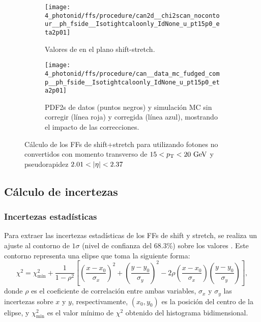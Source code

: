 \begin{figure}[ht!]
    \centering
    \begin{subfigure}[t]{0.49\linewidth}
        \centering
        \texttt{[image: 4\_photonid/ffs/procedure/can2d\_\_chi2scan\_nocontour\_\_ph\_fside\_\_Isotightcaloonly\_IdNone\_u\_pt15p0\_eta2p01]}
        \caption{Valores de \chisq en el plano shift-stretch.}
        \label{fig:ss_corrections:ffs:calculation:fside_calculation:chi2}
    \end{subfigure}
    \hfill
    \begin{subfigure}[t]{0.49\linewidth}
        \centering
        \texttt{[image: 4\_photonid/ffs/procedure/can\_\_data\_mc\_fudged\_comp\_\_ph\_fside\_\_Isotightcaloonly\_IdNone\_u\_pt15p0\_eta2p01]}
        \caption{\acp{PDF2} de datos (puntos negros) y simulaci\'on \ac{MC} sin corregir (l\'inea roja) y corregida (l\'inea azul), mostrando el impacto de las correcciones.}
        \label{fig:ss_corrections:ffs:calculation:fside_calculation:pdfs}
    \end{subfigure}
    \caption{C\'alculo de los \acp{FF} de shift+stretch para \fside utilizando fotones no convertidos con momento transverso de \(15<p_{\text{T}}<20~\text{GeV}\) y pseudorapidez \(2.01<\abseta<2.37\) }
    \label{fig:ss_corrections:ffs:calculation:fside_calculation}
\end{figure}







\subsection{C\'alculo de incertezas}
\label{subsec:ss_corrections:ffs:uncs}

\subsubsection{Incertezas estad\'isticas}

Para extraer las incertezas estadísticas de los \acp{FF} de shift y stretch, se realiza un ajuste al contorno de \(1\sigma\) (nivel de confianza del \(68.3\%\)) sobre los valores \chisq. Este contorno representa una elipse que toma la siguiente forma:
\begin{equation}
    \chi^2 = \chi^2_{\text{min}} + \frac{1}{1-\rho^2} \left[ \left( \frac{x-x_0}{\sigma_x} \right)^2 + \left( \frac{y-y_0}{\sigma_y} \right)^2 - 2\rho \left( \frac{x-x_0}{\sigma_x} \right) \left( \frac{y-y_0}{\sigma_y} \right) \right],
\end{equation}
donde \(\rho\) es el coeficiente de correlación entre ambas variables, \(\sigma_x\) y \(\sigma_y\) las incertezas sobre \(x\) y \(y\), respectivamente, \((x_0, y_0)\) es la posici\'on del centro de la elipse, y \(\chi^2_{\text{min}}\) es el valor mínimo de \(\chi^2\) obtenido del histograma bidimensional.


